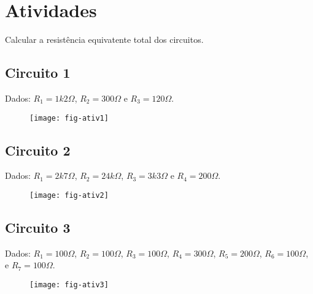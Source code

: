 \section{Atividades}

Calcular a resistência equivatente total dos circuitos.

\subsection{ Circuito 1}
Dados:
$R_1 = 1k2\Omega$,
$R_2 = 300\Omega$ e
$R_3 = 120\Omega$.
\begin{figure}[H]
  \centering
  \label{fig:ativ1}
  \texttt{[image: fig-ativ1]}
\end{figure}

\subsection{ Circuito 2}
Dados:
$R_1 = 2k7\Omega$,
$R_2 = 24k\Omega$,
$R_3 = 3k3\Omega$ e
$R_4 = 200\Omega$.
\begin{figure}[H]
  \centering
  \label{fig:ativ1}
  \texttt{[image: fig-ativ2]}
\end{figure}

\subsection{ Circuito 3}
Dados:
$R_1 = 100\Omega$,
$R_2 = 100\Omega$,
$R_3 = 100\Omega$,
$R_4 = 300\Omega$,
$R_5 = 200\Omega$,
$R_6 = 100\Omega$, e
$R_7 = 100\Omega$.
\begin{figure}[H]
  \centering
  \label{fig:ativ1}
  \texttt{[image: fig-ativ3]}
\end{figure}
